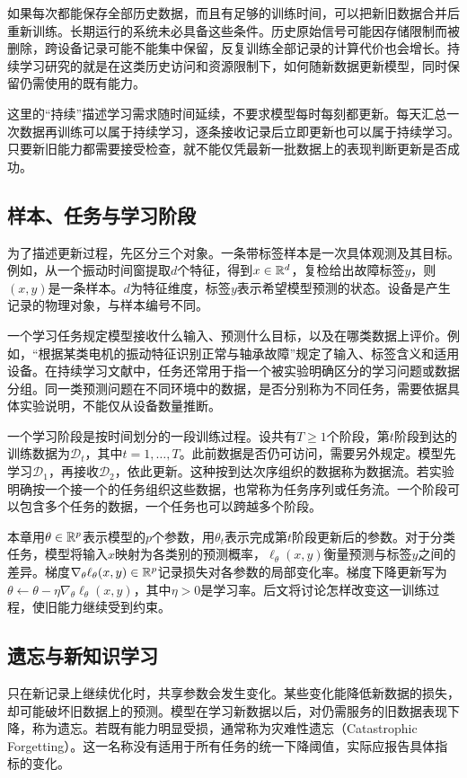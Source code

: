 如果每次都能保存全部历史数据，而且有足够的训练时间，可以把新旧数据合并后重新训练。长期运行的系统未必具备这些条件。历史原始信号可能因存储限制而被删除，跨设备记录可能不能集中保留，反复训练全部记录的计算代价也会增长。持续学习研究的就是在这类历史访问和资源限制下，如何随新数据更新模型，同时保留仍需使用的既有能力\cite{delange2022continual}。

这里的“持续”描述学习需求随时间延续，不要求模型每时每刻都更新。每天汇总一次数据再训练可以属于持续学习，逐条接收记录后立即更新也可以属于持续学习。只要新旧能力都需要接受检查，就不能仅凭最新一批数据上的表现判断更新是否成功。

\subsection{样本、任务与学习阶段}
为了描述更新过程，先区分三个对象。一条带标签样本是一次具体观测及其目标。例如，从一个振动时间窗提取$d$个特征，得到$x\in\mathbb{R}^d$，复检给出故障标签$y$，则$(x,y)$是一条样本。$d$为特征维度，标签$y$表示希望模型预测的状态。设备是产生记录的物理对象，与样本编号不同。

一个学习任务规定模型接收什么输入、预测什么目标，以及在哪类数据上评价。例如，“根据某类电机的振动特征识别正常与轴承故障”规定了输入、标签含义和适用设备。在持续学习文献中，任务还常用于指一个被实验明确区分的学习问题或数据分组。同一类预测问题在不同环境中的数据，是否分别称为不同任务，需要依据具体实验说明，不能仅从设备数量推断。

一个学习阶段是按时间划分的一段训练过程。设共有$T\geq1$个阶段，第$t$阶段到达的训练数据为$\mathcal D_t$，其中$t=1,\ldots,T$。此前数据是否仍可访问，需要另外规定。模型先学习$\mathcal D_1$，再接收$\mathcal D_2$，依此更新。这种按到达次序组织的数据称为数据流。若实验明确按一个接一个的任务组织这些数据，也常称为任务序列或任务流。一个阶段可以包含多个任务的数据，一个任务也可以跨越多个阶段。

本章用$\theta\in\mathbb{R}^p$表示模型的$p$个参数，用$\theta_t$表示完成第$t$阶段更新后的参数。对于分类任务，模型将输入$x$映射为各类别的预测概率，$\ell_\theta(x,y)$衡量预测与标签$y$之间的差异。梯度$\nabla_\theta\ell_\theta(x,y)\in\mathbb{R}^p$记录损失对各参数的局部变化率。梯度下降更新写为$\theta\leftarrow\theta-\eta\nabla_\theta\ell_\theta(x,y)$，其中$\eta>0$是学习率。后文将讨论怎样改变这一训练过程，使旧能力继续受到约束。

\subsection{遗忘与新知识学习}
只在新记录上继续优化时，共享参数会发生变化。某些变化能降低新数据的损失，却可能破坏旧数据上的预测。模型在学习新数据以后，对仍需服务的旧数据表现下降，称为遗忘。若既有能力明显受损，通常称为灾难性遗忘（Catastrophic Forgetting）。这一名称没有适用于所有任务的统一下降阈值，实际应报告具体指标的变化\cite{delange2022continual}。

